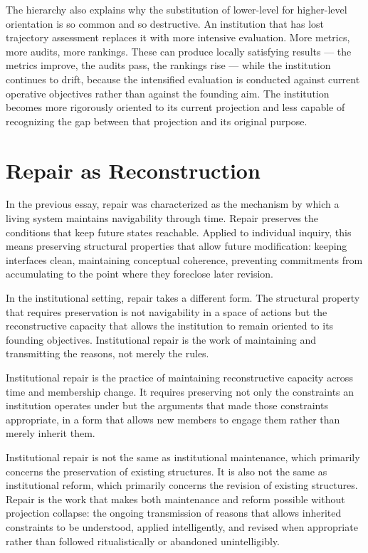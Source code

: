 The hierarchy also explains why the substitution of lower-level for higher-level
orientation is so common and so destructive. An institution that has lost
trajectory assessment replaces it with more intensive evaluation. More metrics,
more audits, more rankings. These can produce locally satisfying results ---
the metrics improve, the audits pass, the rankings rise --- while the
institution continues to drift, because the intensified evaluation is conducted
against current operative objectives rather than against the founding aim.
The institution becomes more rigorously oriented to its current projection
and less capable of recognizing the gap between that projection and its
original purpose.

\section{Repair as Reconstruction}

In the previous essay, repair was characterized as the mechanism by which a
living system maintains navigability through time. Repair preserves the
conditions that keep future states reachable. Applied to individual inquiry,
this means preserving structural properties that allow future modification:
keeping interfaces clean, maintaining conceptual coherence, preventing
commitments from accumulating to the point where they foreclose later revision.

In the institutional setting, repair takes a different form. The structural
property that requires preservation is not navigability in a space of actions
but the reconstructive capacity that allows the institution to remain oriented
to its founding objectives. Institutional repair is the work of maintaining
and transmitting the reasons, not merely the rules.

\begin{principle}
Institutional repair is the practice of maintaining reconstructive capacity
across time and membership change. It requires preserving not only the
constraints an institution operates under but the arguments that made those
constraints appropriate, in a form that allows new members to engage them
rather than merely inherit them.
\end{principle}

Institutional repair is not the same as institutional maintenance, which
primarily concerns the preservation of existing structures. It is also not
the same as institutional reform, which primarily concerns the revision of
existing structures. Repair is the work that makes both maintenance and reform
possible without projection collapse: the ongoing transmission of reasons that
allows inherited constraints to be understood, applied intelligently, and
revised when appropriate rather than followed ritualistically or abandoned
unintelligibly.

